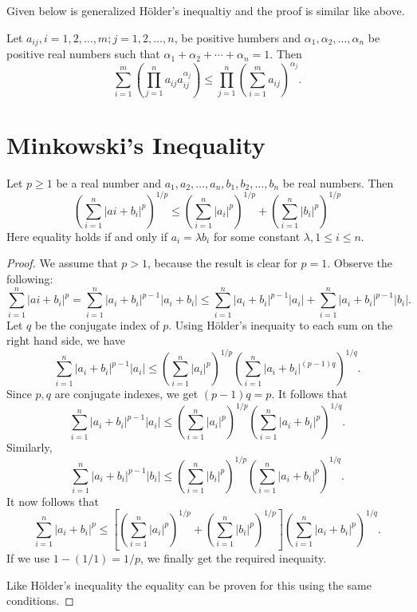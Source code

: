 Given below is generalized H\"{o}lder's inequaltiy and the proof is similar like above.
\begin{theorem}
  Let $a_{ij}, i=1, 2, \ldots, m;j = 1, 2, \ldots, n$, be positive humbers and $\alpha_1, \alpha_2, \ldots, \alpha_n$ be positive
  real numbers such that $\alpha_1 + \alpha_2 + \cdots + \alpha_n = 1$. Then
  \begin{equation}
    \sum_{i=1}^m\left(\prod_{j=1}^na_{ij}a_{ij}^{\alpha_j}\right)\leq \prod_{j=1}^n\left(\sum_{i=1}^ma_{ij}\right)^{\alpha_j}.
  \end{equation}
\end{theorem}

\section{Minkowski's Inequality}
\begin{theorem}
  Let $p\geq 1$ be a real number and $a_1, a_2, \ldots, a_n, b_1, b_2, \ldots, b_n$ be real numbers. Then
  \begin{equation}
    \label{eq:10.7}
    \left(\sum_{i=1}^n|ai + b_i|^p\right)^{1/p}\leq\left(\sum_{i=1}^n|a_i|^p\right)^{1/p} + \left(\sum_{i=1}^n|b_i|^p\right)^{1/p}
  \end{equation}
  Here equality holds if and only if $a_i=\lambda b_i$ for some constant $\lambda, 1\leq i\leq n$.
\end{theorem}

\begin{proof}
  We assume that $p > 1$, because the result is clear for $p = 1$. Observe the following:
  $$\sum_{i=1}^n|ai + b_i|^p = \sum_{i=1}^n|a_i + b_i|^{p - 1}|a_i + b_i|\leq \sum_{i=1}^n|a_i + b_i|^{p - 1}|a_i| +
  \sum_{i=1}^n|a_i + b_i|^{p - 1}|b_i|.$$
  Let $q$ be the conjugate index of $p$. Using H\"{o}lder's inequaity to each sum on the right hand side, we have
  $$\sum_{i=1}^n|a_i + b_i|^{p - 1}|a_i|\leq \left(\sum_{i=1}^n|a_i|^p\right)^{1/p}\left(\sum_{i=1}^n|a_i + b_i|^{(p -
    1)q}\right)^{1/q}.$$
  Since $p, q$ are conjugate indexes, we get $(p - 1)q = p$. It follows that
  $$\sum_{i=1}^n|a_i + b_i|^{p - 1}|a_i|\leq\left(\sum_{i=1}^n|a_i|^p\right)^{1/p}\left(\sum_{i=1}^n|a_i + b_i|^p\right)^{1/q}.$$
  Similarly,
  $$\sum_{i=1}^n|a_i + b_i|^{p - 1}|b_i|\leq\left(\sum_{i=1}^n|b_i|^p\right)^{1/p}\left(\sum_{i=1}^n|a_i + b_i|^p\right)^{1/q}.$$
  It now follows that
  $$\sum_{i=1}^n|a_i + b_i|^p\leq\left[\left(\sum_{i=1}^n|a_i|^p\right)^{1/p} +
    \left(\sum_{i=1}^n|b_i|^p\right)^{1/p}\right]\left(\sum_{i=1}^n|a_i + b_i|^p\right)^{1/q}.$$
  If we use $1 - (1/1) = 1/p$, we finally get the required inequaity.

  Like H\"{o}lder's inequality the equality can be proven for this using the same conditions.
\end{proof}

